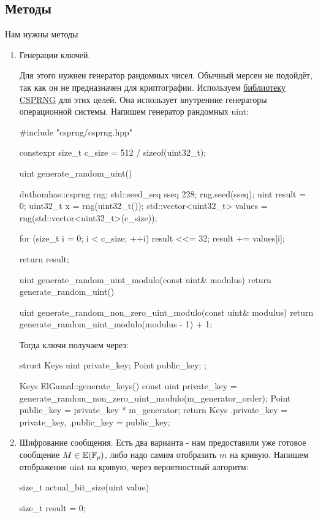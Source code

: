 \subsection{Методы}
Нам нужны методы
\begin{enumerate}
  \item Генерации ключей.

  Для этого нужнен генератор рандомных чисел. Обычный мерсен не подойдёт, так как он не предназначен для криптографии. Используем \href{https://github.com/Duthomhas/CSPRNG}{библиотеку CSPRNG} для этих целей. Она использует внутренние генераторы операционной системы. Напишем генератор рандомных uint:
  \begin{cppcode}
#include "csprng/csprng.hpp"

constexpr size_t c_size = 512 / sizeof(uint32_t);

uint generate_random_uint() {
    duthomhas::csprng rng;
    std::seed_seq sseq {228};
    rng.seed(sseq);
    uint result = 0;
    uint32_t x = rng(uint32_t());
    std::vector<uint32_t> values = rng(std::vector<uint32_t>(c_size));

    for (size_t i = 0; i < c_size; ++i) {
        result <<= 32;
        result += values[i];
    }

    return result;
}

uint generate_random_uint_modulo(const uint& modulus) {
    return generate_random_uint() %
}

uint generate_random_non_zero_uint_modulo(const uint& modulus) {
    return generate_random_uint_modulo(modulus - 1) + 1;
}
  \end{cppcode}

  Тогда ключи получаем через:
  \begin{cppcode}
struct Keys {
    uint private_key;
    Point public_key;
};

Keys ElGamal::generate_keys() const {
    uint private_key = generate_random_non_zero_uint_modulo(m_generator_order);
    Point public_key = private_key * m_generator;
    return Keys {.private_key = private_key, .public_key = public_key};
}
  \end{cppcode}
  \item Шифрование сообщения. Есть два варианта - нам предоставили уже готовое сообщение $M\in\mathbb E(\mathbb F_p)$, либо надо самим отобразить $m$ на кривую. Напишем отображение uint на кривую, через вероятностный алгоритм:
  \begin{cppcode}
size_t actual_bit_size(uint value) {
    size_t result = 0;

}
\end{cppcode}
\end{enumerate}
